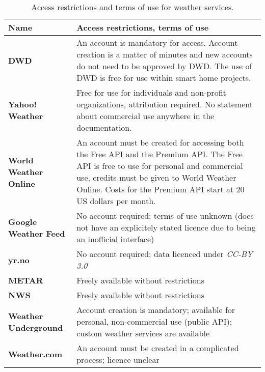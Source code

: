 \begin{table}
\centering
\begin{tabular}{|p{}|p{}|}
  \hline
  \textbf{Name} & \textbf{Access restrictions, terms of use} \\
  \hline\hline
  \textbf{DWD} & An account is mandatory for access. Account creation is a matter of minutes and new accounts do not need to be approved by DWD. The use of DWD is free for use within smart home projects.\\
  \hline
  \textbf{Yahoo! Weather} & Free for use for individuals and non-profit organizations, attribution required. No statement about commercial use anywhere in the documentation.\\
  \hline
  \textbf{World Weather Online} & An account must be created for accessing both the Free API and the Premium API. The Free API is free to use for personal and commercial use, credits must be given to World Weather Online. Costs for the Premium API start at 20 US dollars per month.\\
  \hline
  \textbf{Google Weather Feed} & No account required; terms of use unknown (does not have an explicitely stated licence due to being an inofficial interface) \\
  \hline
  \textbf{yr.no} & No account required; data licenced under \emph{CC-BY 3.0}~\cite{ccby30}\\
  \hline
  \textbf{\acs{METAR}} & Freely available without restrictions \\
  \hline
  \textbf{\acs{NWS}} & Freely available without restrictions \\
  \hline
  \textbf{Weather Underground} & Account creation is mandatory; available for personal, non-commercial use (public API); custom weather services are available \\
  \hline
  \textbf{Weather.com} & An account must be created in a complicated process; licence unclear \\
  \hline
\end{tabular}
\caption{Access restrictions and terms of use for weather services.}
\label{table:weather_data4}
\end{table}

